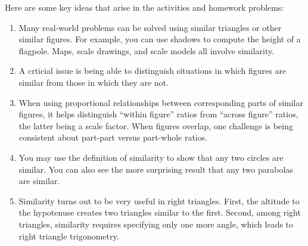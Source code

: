 Here are some key ideas that arise in the activities and homework problems: 
\begin{enumerate}
\item Many real-world problems can be solved using similar triangles or other similar figures.  For example, you can use shadows to 
compute the height of a flagpole.  Maps, scale drawings, and scale models all involve similarity.  

\item A crticial issue is being able to distinguish situations in which figures are similar from those in which they are not.  

\item When using proportional relationships between corresponding parts of similar figures, it helps distinguish ``within figure'' ratios from ``across figure'' ratios, the latter being a scale factor.  When figures overlap, one challenge is being consistent about part-part versus part-whole ratios.

\item You may use the definition of similarity to show that any two circles are similar.  You can also see the more surprising result that any two parabolas are similar.  

\item Similarity turns out to be very useful in right triangles.  First, the altitude to the hypotenuse creates two triangles similar to the first.  Second, among right triangles, similarity requires specifying only one more angle, which leads to right triangle trigonometry.  
\end{enumerate}


